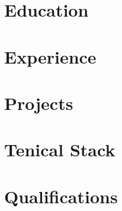 \documentclass[UTF8]{ctexart} %
\begin{document}

\section{Education}
\section{Experience}
\section{Projects}
\section{Tenical Stack}
\section{Qualifications}
%
\vspace{-10pt} %
% 
\end{document}

